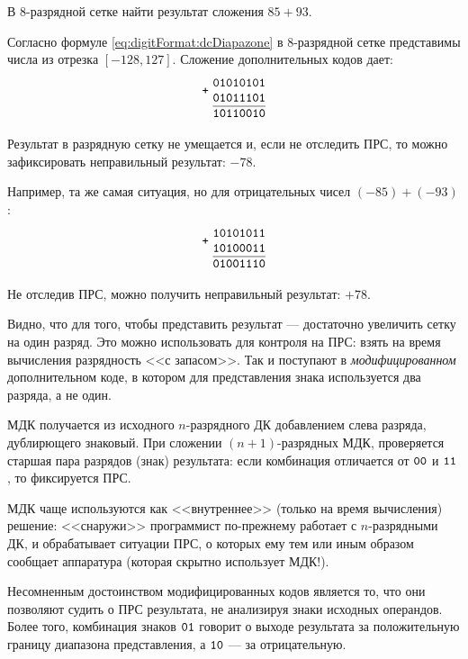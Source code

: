 \begin{Example}
    В $8$-разрядной сетке найти результат сложения $85+93$.
\end{Example}
\begin{Solve}
    Согласно формуле \eqref{eq:digitFormat:dcDiapazone} в $8$-разрядной сетке представимы числа из отрезка $[-128,127]$. Сложение дополнительных кодов дает:
    \[
        \Addition{01010101}{01011101}{10110010}
    \]
    
    Результат в разрядную сетку не умещается и, если не отследить ПРС, то можно зафиксировать неправильный результат: $-78$.
    
    Например, та же самая ситуация, но для отрицательных чисел $(-85)+(-93)$:
    \[
        \Addition{10101011}{10100011}{01001110}
    \]
    
    Не отследив ПРС, можно получить неправильный результат: $+78$.
\end{Solve}

Видно, что для того, чтобы представить результат --- достаточно увеличить сетку на один разряд. Это можно использовать для контроля на ПРС: взять на время вычисления разрядность <<с запасом>>. Так и поступают в \emph{модифицированном} дополнительном коде, в котором для представления знака используется два разряда, а не один.

\begin{Note}
    МДК получается из исходного $n$-разрядного ДК добавлением слева разряда, дублирющего знаковый. При сложении $(n+1)$-разрядных МДК, проверяется старшая пара разрядов (знак) результата: если комбинация отличается от $\texttt{00}$ и $\texttt{11}$, то фиксируется ПРС.
\end{Note}

\begin{Note}
    МДК чаще используются как <<внутреннее>> (только на время вычисления) решение: <<снаружи>> программист по-прежнему работает с $n$-разрядными ДК, и обрабатывает ситуации ПРС, о которых ему тем или иным образом сообщает аппаратура (которая скрытно использует МДК!).
\end{Note}

Несомненным достоинством модифицированных кодов является то, что они позволяют судить о ПРС результата, не анализируя знаки исходных операндов. Более того, комбинация знаков $\texttt{01}$ говорит о выходе результата за положительную границу диапазона представления, а $\texttt{10}$ --- за отрицательную.
    
